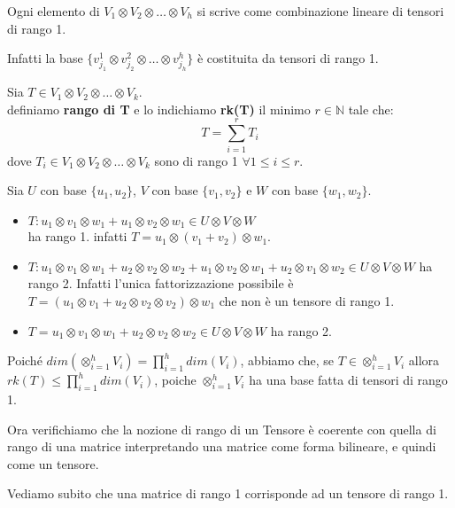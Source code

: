 \documentclass[../main.tex]{subfiles}
\begin{document}
Ogni elemento di $V_1 \otimes V_2 \otimes \ldots \otimes V_h$ si scrive come combinazione lineare di tensori di rango 1.

Infatti la base $\{v_{j_1}^1 \otimes v_{j_2}^2 \otimes \ldots \otimes v_{j_h}^h\}$ è costituita da tensori di rango 1.
\begin{definition}
    Sia $T \in V_1 \otimes V_2 \otimes \ldots \otimes V_k$.\\
    definiamo \textbf{rango di T} e lo indichiamo \textbf{rk(T)} il minimo $r \in \mathbb{N}$ tale che:
    \begin{equation*}
        T = \sum_{i=1}^{r}T_i
    \end{equation*}
    dove $T_i \in V_1 \otimes V_2 \otimes \ldots \otimes V_k$ sono di rango 1 $\forall 1 \leq i \leq r$.
\end{definition}

\begin{example}
    Sia $U$ con base $\{u_1, u_2\}$, $V$ con base $\{v_1, v_2\}$ e $W$ con base $\{w_1, w_2\}$.
    \begin{itemize}
        \item $T: u_1 \otimes v_1 \otimes w_1 + u_1 \otimes v_2 \otimes w_1  \in U \otimes V  \otimes W$\\
              ha rango 1. infatti $T = u_1 \otimes (v_1 + v_2 )\otimes w_1$.
        \item $T: u_1 \otimes v_1 \otimes w_1 + u_2 \otimes v_2 \otimes w_2 + u_1 \otimes v_2 \otimes w_1 + u_2 \otimes v_1 \otimes w_2 \in U \otimes V \otimes W$ ha rango 2.
              Infatti l'unica fattorizzazione possibile è $T = (u_1 \otimes v_1  + u_2 \otimes v_2 \otimes v_2) \otimes w_1$ che non è un tensore di rango 1.
        \item $T = u_1 \otimes v_1 \otimes w_1 + u_2 \otimes v_2 \otimes w_2 \in U \otimes V \otimes W $ ha rango 2.
    \end{itemize}
\end{example}

Poiché $dim(\otimes_{i=1}^{h} V_i) = \prod_{i=1}^{h} dim(V_i)$, abbiamo che, se $T \in \otimes_{i=1}^{h} V_i$ allora $rk(T) \leq \prod_{i=1}^{h} dim(V_i)$, poiche $\otimes_{i=1}^{h} V_i$ ha una base fatta di tensori di rango 1.

Ora verifichiamo che la nozione di rango di un Tensore è coerente con quella di rango di una matrice interpretando una matrice come forma bilineare, e quindi come un tensore.

Vediamo subito che una matrice di rango 1 corrisponde ad un tensore di rango 1.
\end{document}
